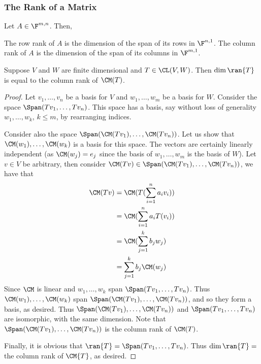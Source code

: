 \documentclass{article}
\begin{document}
\subsubsection{The Rank of a Matrix}
  \begin{defn}
    Let $A \in \F^{m, n}$. Then,
    \begin{enumerate}[label=\alph*)]
      \ii 
        The row rank of $A$ is the dimension of the span of its rows in $\F^{n, 1}$.
      \ii 
        The column rank of $A$ is the dimension of the span of its columns in $\F^{m, 1}$.
    \end{enumerate}
  \end{defn}
  \begin{prop}
    Suppose $V$ and $W$ are finite dimensional and $T \in \CL(V, W)$. Then $\dim{\ran{T}}$ is equal to the column rank of $\CM(T)$.
  \end{prop}
  \begin{proof}
    Let $v_1, \dots, v_n$ be a basis for $V$ and $w_1, \dots, w_m$ be a basis for $W$. Consider the space $\Span(Tv_1, \dots, Tv_n)$. This space has a basis, say without loss of generality
    $w_1, \dots, w_k$, $k \leq m$, by rearranging indices. 

    Consider also the space $\Span(\CM(Tv_1), \dots, \CM(Tv_n))$. Let us show that $\CM(w_1), \dots, \CM(w_k)$ is a basis for this space. The vectors are certainly linearly independent (as
    $\CM(w_j) = e_j$ since the basis of $w_1, \dots, w_m$ is the basis of $W$). Let $v \in V$ be arbitrary, then consider $\CM(Tv) \in \Span(\CM(Tv_1), \dots, \CM(Tv_n))$, we have that
    \begin{align*}
      \CM(Tv) & = \CM(T(\sum_{i = 1}^{n}a_iv_i)) \\
      & = \CM(\sum_{i = 1}^{n}a_iT(v_i)) \\
      & = \CM(\sum_{j = 1}^{k}b_jw_j) \\
      & = \sum_{j = 1}^{k}b_j\CM(w_j) \\
    \end{align*}
    Since $\CM$ is linear and $w_1, \dots, w_k$ span $\Span(Tv_1, \dots, Tv_n)$. Thus $\CM(w_1), \dots, \CM(w_k)$ span $\Span(\CM(Tv_1), \dots, \CM(Tv_n))$, and so they form a basis, as
    desired. Thus $\Span(\CM(Tv_1), \dots, \CM(Tv_n))$ and $\Span(Tv_1, \dots, Tv_n)$ are isomorphic, with the same dimension. Note that $\Span(\CM(Tv_1), \dots, \CM(Tv_n))$ is the column
    rank of $\CM(T)$. 

    Finally, it is obvious that $\ran{T} = \Span(Tv_1, \dots, Tv_n)$. Thus $\dim\ran{T} = $ the column rank of $\CM{T}$, as desired.
  \end{proof}
\end{document}
